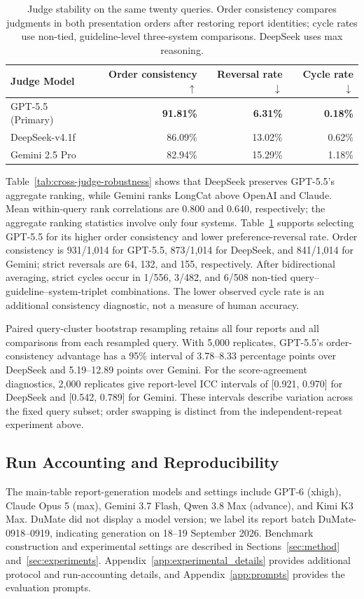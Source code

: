 \documentclass{article}
\begin{document}
\begin{table}[t]
\centering
\small
\setlength{\tabcolsep}{8pt}
\begin{tabular}{@{}lrrr@{}}
\toprule
Judge Model & Order consistency $\uparrow$ & Reversal rate $\downarrow$ & Cycle rate $\downarrow$ \\
\midrule
GPT-5.5 (Primary) & \textbf{91.81\%} & \textbf{6.31\%} & \textbf{0.18\%} \\
DeepSeek-v4.1f & 86.09\% & 13.02\% & 0.62\% \\
Gemini 2.5 Pro & 82.94\% & 15.29\% & 1.18\% \\
\bottomrule
\end{tabular}
\caption{Judge stability on the same twenty queries. Order consistency compares judgments in both presentation orders after restoring report identities; cycle rates use non-tied, guideline-level three-system comparisons. DeepSeek uses max reasoning.}
\label{tab:judge-stability}
\end{table}

Table~\ref{tab:cross-judge-robustness} shows that DeepSeek preserves GPT-5.5's aggregate ranking, while Gemini ranks LongCat above OpenAI and Claude. Mean within-query rank correlations are 0.800 and 0.640, respectively; the aggregate ranking statistics involve only four systems. Table~\ref{tab:judge-stability} supports selecting GPT-5.5 for its higher order consistency and lower preference-reversal rate. Order consistency is 931/1,014 for GPT-5.5, 873/1,014 for DeepSeek, and 841/1,014 for Gemini; strict reversals are 64, 132, and 155, respectively. After bidirectional averaging, strict cycles occur in 1/556, 3/482, and 6/508 non-tied query--guideline--system-triplet combinations. The lower observed cycle rate is an additional consistency diagnostic, not a measure of human accuracy.

Paired query-cluster bootstrap resampling retains all four reports and all comparisons from each resampled query. With 5,000 replicates, GPT-5.5's order-consistency advantage has a 95\% interval of 3.78--8.33 percentage points over DeepSeek and 5.19--12.89 points over Gemini. For the score-agreement diagnostics, 2,000 replicates give report-level ICC intervals of [0.921, 0.970] for DeepSeek and [0.542, 0.789] for Gemini. These intervals describe variation across the fixed query subset; order swapping is distinct from the independent-repeat experiment above.

\subsection{Run Accounting and Reproducibility}
\label{app:run_accounting}
The main-table report-generation models and settings include GPT-6 (xhigh), Claude Opus 5 (max), Gemini 3.7 Flash, Qwen 3.8 Max (advance), and Kimi K3 Max. DuMate did not display a model version; we label its report batch DuMate-0918--0919, indicating generation on 18--19 September 2026. Benchmark construction and experimental settings are described in Sections~\ref{sec:method} and~\ref{sec:experiments}. Appendix~\ref{app:experimental_details} provides additional protocol and run-accounting details, and Appendix~\ref{app:prompts} provides the evaluation prompts.
\end{document}
